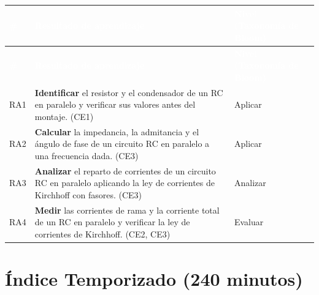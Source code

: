 \documentclass[11pt,letterpaper]{article}
\begin{document}
\begin{xltabular}{\linewidth}{>{\raggedright\arraybackslash}p{1.1cm}>{\raggedright\arraybackslash}X>{\raggedright\arraybackslash}p{3.9cm}}
 \textcolor{white}{\textbf{\#}} & \textcolor{white}{\textbf{Resultado de aprendizaje}} & \textcolor{white}{\textbf{Nivel (Taxonomía de Bloom)}} \\
\endfirsthead
{} \textcolor{white}{\textbf{\#}} & \textcolor{white}{\textbf{Resultado de aprendizaje}} & \textcolor{white}{\textbf{Nivel (Taxonomía de Bloom)}} \\
\endhead
\bottomrule
\endlastfoot
  RA1 & \textbf{Identificar} el resistor y el condensador de un RC en paralelo y verificar sus valores antes del montaje. (CE1) & Aplicar \\
   RA2 & \textbf{Calcular} la impedancia, la admitancia y el ángulo de fase de un circuito RC en paralelo a una frecuencia dada. (CE3) & Aplicar \\
  RA3 & \textbf{Analizar} el reparto de corrientes de un circuito RC en paralelo aplicando la ley de corrientes de Kirchhoff con fasores. (CE3) & Analizar \\
   RA4 & \textbf{Medir} las corrientes de rama y la corriente total de un RC en paralelo y verificar la ley de corrientes de Kirchhoff. (CE2, CE3) & Evaluar \\
\end{xltabular}

\section{Índice Temporizado (240 minutos)}
\end{document}
